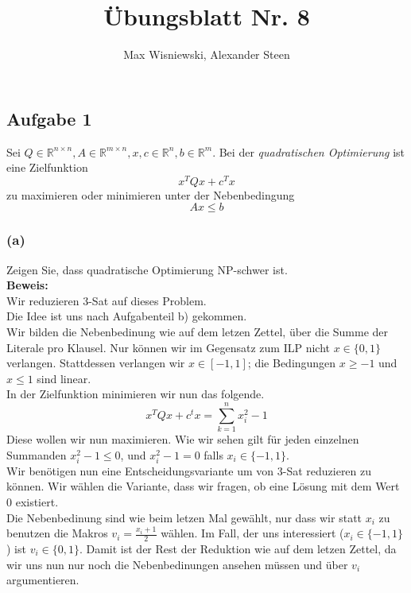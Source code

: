 \documentclass[11pt,a4paper,ngerman]{article}
\date{}
\title{Übungsblatt Nr. 8}
\author{Max Wisniewski, Alexander Steen}
\begin{document}
\renewcommand{\figurename}{Figure}
\maketitle
\thispagestyle{fancy}

    
\subsection*{Aufgabe 1}

Sei $Q \in \mathbb{R}^{n\times n}, A \in \mathbb{R}^{m \times n}, x,c \in \mathbb{R}^n, b \in \mathbb{R}^m$.
Bei der \emph{quadratischen Optimierung} ist eine Zielfunktion
$$
    x^T Q x + c^Tx
$$
zu maximieren oder minimieren unter der Nebenbedingung
$$
   A x \leq b
$$
\subsubsection*{(a)}
Zeigen Sie, dass quadratische Optimierung NP-schwer ist.\\

\textbf{Beweis:}\\
Wir reduzieren 3-Sat auf dieses Problem.\\

Die Idee ist uns nach Aufgabenteil b) gekommen.\\
Wir bilden die Nebenbedinung wie auf dem letzen Zettel, über die Summe der Literale pro Klausel. Nur können wir
im Gegensatz zum ILP nicht $x \in \{ 0 , 1 \}$ verlangen. Stattdessen verlangen wir $x \in [-1, 1]$; die Bedingungen $x \geq -1$ und $x \leq 1$ sind linear.\\

In der Zielfunktion minimieren wir nun das folgende.
$$
    x^T Q x + c^tx = \overset{n}{\underset{k=1}{\sum}} x_i^2 - 1
$$
Diese wollen wir nun maximieren. Wie wir sehen gilt für jeden einzelnen Summanden $x_i^2 - 1 \leq 0$, und $x_i^2 - 1 = 0$ falls $x_i \in \{ -1 , 1\}$.\\

Wir benötigen nun eine Entscheidungsvariante um von 3-Sat reduzieren zu können. Wir wählen die Variante, dass wir fragen,
ob eine Lösung mit dem Wert $0$ existiert.\\

Die Nebenbedinung sind wie beim letzen Mal gewählt, nur dass wir statt $x_i$ zu benutzen
die Makros $v_i = \frac{x_i + 1}{2}$ wählen. Im Fall, der uns interessiert ($x_i \in \{-1 , 1\}$) ist $v_i \in \{ 0, 1 \}$.
Damit ist der Rest der Reduktion wie auf dem letzen Zettel, da wir uns nun nur noch die Nebenbedinungen ansehen müssen
und über $v_i$ argumentieren.
\end{document}
